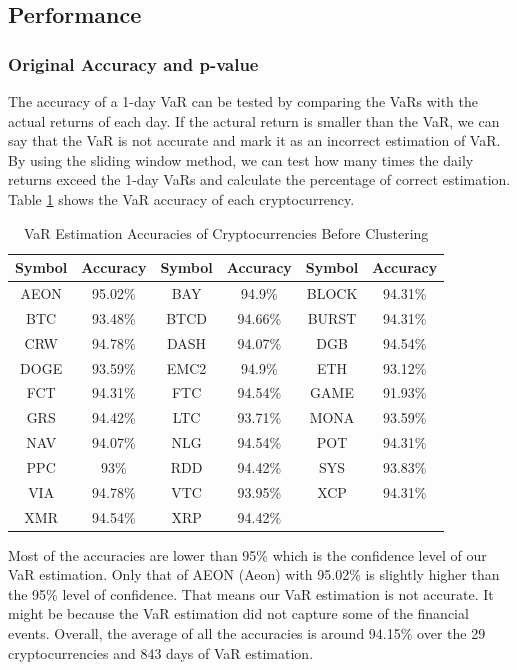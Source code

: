 \documentclass[11pt]{article} %
\theoremstyle{plain}
\theoremstyle{definition}
\begin{document}
\subsection{Performance}

\subsubsection{Original Accuracy and p-value}

The accuracy of a 1-day VaR can be tested by comparing the VaRs with the actual returns of each day. If the actural return is smaller than the VaR, we can say that the VaR is not accurate and mark it as an incorrect estimation of VaR. By using the sliding window method, we can test how many times the daily returns exceed the 1-day VaRs and calculate the percentage of correct estimation. Table \ref{table:acccryptobefore} shows the VaR accuracy of each cryptocurrency.

{
  \begin{table}[ht]
    \centering
    \small
    \begin{tabular}{|c|c|c|c|c|c|}
        \hline
        Symbol & Accuracy & Symbol & Accuracy & Symbol & Accuracy \\
        \hline
        AEON & 95.02\% & BAY & 94.9\% & BLOCK & 94.31\% \\
        BTC & 93.48\% & BTCD & 94.66\% & BURST & 94.31\% \\
        CRW & 94.78\% & DASH & 94.07\% & DGB & 94.54\% \\
        DOGE & 93.59\% & EMC2 & 94.9\% & ETH & 93.12\% \\
        FCT & 94.31\% & FTC & 94.54\% & GAME & 91.93\% \\
        GRS & 94.42\% & LTC & 93.71\% & MONA & 93.59\% \\
        NAV & 94.07\% & NLG & 94.54\% & POT & 94.31\% \\
        PPC & 93\% & RDD & 94.42\% & SYS & 93.83\% \\
        VIA & 94.78\% & VTC & 93.95\% & XCP & 94.31\% \\
        XMR & 94.54\% & XRP & 94.42\% & & \\
        \hline
    \end{tabular}
    \caption{VaR Estimation Accuracies of Cryptocurrencies Before Clustering}
    \label{table:acccryptobefore}
  \end{table}
}

Most of the accuracies are lower than 95\% which is the confidence level of our VaR estimation. Only that of AEON (Aeon) with 95.02\% is slightly higher than the 95\% level of confidence. That means our VaR estimation is not accurate. It might be because the VaR estimation did not capture some of the financial events. Overall, the average of all the accuracies is around 94.15\% over the 29 cryptocurrencies and 843 days of VaR estimation.
\end{document}

